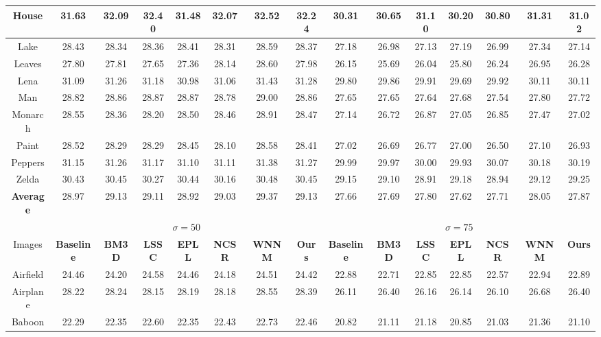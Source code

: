 \documentclass[10pt,twocolumn,letterpaper]{article}
\begin{document}
\begin{table*}[t]
\begin{center}
\begin{tabular}{|c||c|c|c|c|c|c|c||c|c|c|c|c|c|c|}
\\
\hline
 House& 31.63 & 32.09 & 32.40  & 31.48  & 32.07 & 32.52 & 32.24    &30.31&   30.65  & 31.10   & 30.20   & 30.80  & 31.31 &31.02    
\\
\hline
 Lake &28.43  & 28.34 & 28.36  & 28.41   & 28.31   &  28.59 &28.37   &27.18 &   26.98  & 27.13 &  27.19  & 26.99 &27.34 & 27.14  
\\
\hline
 Leaves&27.80 & 27.81 & 27.65& 27.36 & 28.14 & 28.60 &27.98     & 26.15& 25.69 & 26.04 & 25.80 & 26.24 & 26.95 & 26.28  
\\
\hline
 Lena&31.09& 31.26 & 31.18  & 30.98 &  31.06& 31.43  &  31.28     &29.80 & 29.86& 29.91 & 29.69 & 29.92 & 30.11 &30.11   
\\
\hline
 Man& 28.82& 28.86 & 28.87 & 28.87 & 28.78 & 29.00 & 28.86     &27.65&   27.65  & 27.64 & 27.68 & 27.54 &27.80 & 27.72     
\\
\hline
 Monarch& 28.55& 28.36 & 28.20 & 28.50 & 28.46 & 28.91  &  28.47   &27.14 &   26.72  & 26.87 &  27.05  & 26.85 & 27.47 &27.02    
\\
\hline
 Paint&28.52 & 28.29 & 28.29 & 28.45  &  28.10  & 28.58 &28.41   & 27.02 &  26.69 &  26.77 &  27.00  & 26.50 & 27.10 & 26.93 
\\
\hline
 Peppers &31.15& 31.26 & 31.17 & 31.10 & 31.11  & 31.38  & 31.27   &29.99 &   29.97  & 30.00  &  29.93 &  30.07 & 30.18 & 30.19    
\\
\hline
 Zelda& 30.43 & 30.45 & 30.27  & 30.44  &  30.16  & 30.48  &30.45    &29.15& 29.10  &  28.91 &  29.18  & 28.94 & 29.12 &29.25   
\\
\hline
 \textbf{Average} & 28.97 &  29.13 & 29.11  &  28.92 & 29.03  & 29.37 & 29.13   &27.66 &  27.69   & 27.80 &  27.62  & 27.71 & 28.05 &27.87     
\\
\hline
\hline
&\multicolumn{7}{c||}{ $\sigma = 50$}&\multicolumn{7}{c|}{ $\sigma = 75$}
\\
\hline
\hline
Images&\textbf{Baseline}&\textbf{BM3D}&\textbf{LSSC}&\textbf{EPLL}&\textbf{NCSR}&\textbf{WNNM}&\textbf{Ours}&
\textbf{Baseline}&\textbf{BM3D}&\textbf{LSSC}&\textbf{EPLL}&\textbf{NCSR}&\textbf{WNNM}&\textbf{Ours} 
\\
\hline
 Airfield & 24.46& 24.20 & 24.58 & 24.46  &24.18 & 24.51 & 24.42   &22.88  & 22.71 & 22.85 & 22.85 & 22.57 &22.94 &22.89 
\\
\hline
 Airplane &28.22& 28.24 & 28.15 & 28.19 & 28.18 &  28.55& 28.39     &26.11& 26.40 & 26.16 & 26.14  & 26.10 &  26.68& 26.40
\\
\hline
 Baboon & 22.29& 22.35  & 22.60 & 22.35 & 22.43  & 22.73&22.46     &20.82 &  21.11&  21.18  & 20.85  & 21.03  & 21.36& 21.10

\end{tabular}
\end{center}
\end{table*}
\end{document}

